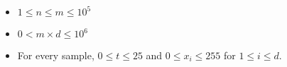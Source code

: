 \begin{itemize}
\tightlist
\item $1\le n\le m\le 10^5$
\item $0 < m\times d\le 10^6$
\item For every sample, $0\le t \le 25$ and $0\le x_i\le 255$ for $1\le i\le d$.
\end{itemize}
